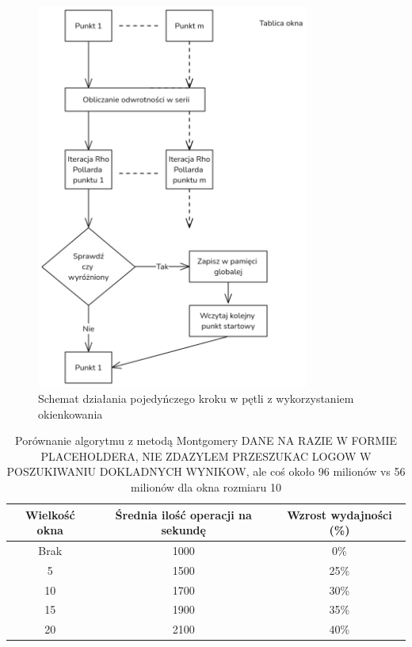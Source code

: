 \begin{figure}[H]
    \centering
    \includegraphics[width=0.8\textwidth]{img/okienkowanie_3.png}
    \caption{Schemat działania pojedyńczego kroku w pętli z wykorzystaniem okienkowania}
    \label{fig:windowing}
\end{figure}

\begin{table}[h!]
    \centering
    \begin{tabular}{|c|c|c|}
        \hline
        \textbf{Wielkość okna} & \textbf{Średnia ilość operacji na sekundę} & \textbf{Wzrost wydajności (\%)} \\ \hline
        Brak                   & 1000                                       & 0\%                             \\ \hline
        5                      & 1500                                       & 25\%                            \\ \hline
        10                     & 1700                                       & 30\%                            \\ \hline
        15                     & 1900                                       & 35\%                            \\ \hline
        20                     & 2100                                       & 40\%                            \\ \hline
    \end{tabular}
    \caption{Porównanie algorytmu z metodą Montgomery DANE NA RAZIE W FORMIE PLACEHOLDERA, NIE ZDAZYLEM PRZESZUKAC LOGOW W POSZUKIWANIU DOKLADNYCH WYNIKOW, ale coś około 96 milionów vs 56 milionów dla okna rozmiaru 10}
    \label{tab:comparison}
\end{table}


